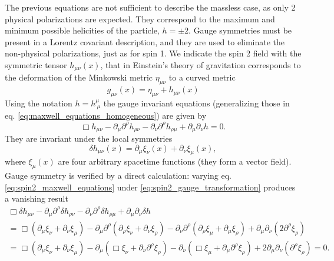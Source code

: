 The previous equations are not sufficient to describe the massless case, as only 2 physical polarizations are expected. They correspond to the maximum and minimum possible helicities of the particle, \(h=\pm 2\). Gauge symmetries must be present in a Lorentz covariant description, and they are used to eliminate the non-physical polarizations, just as for spin 1. We indicate the spin 2 field with the symmetric tensor \(h_{\mu \nu}(x)\), that in Einstein’s theory of gravitation corresponds to the deformation of the Minkowski metric \(\eta_{\mu \nu}\) to a curved metric
\begin{equation}
    g_{\mu \nu}(x)= \eta_{\mu \nu} + h_{\mu \nu}(x)
    \label{eq:metric_deformation}
\end{equation}
Using the notation \(h = h^{\mu}_{\ \mu}\) the gauge invariant equations (generalizing those in eq. \eqref{eq:maxwell_equations_homogeneous}) are given by
\begin{equation}
    \Box h_{\mu \nu} - \partial_\mu \partial^{\rho} h_{\rho \nu} - \partial_\nu \partial^{\rho} h_{\rho \mu} + \partial_\mu \partial_\nu h = 0.
    \label{eq:spin2_maxwell_equations}
\end{equation}
They are invariant under the local symmetries
\begin{equation}
    \delta h_{\mu \nu}(x) = \partial_\mu \xi_{\nu}(x) + \partial_\nu \xi_{\mu}(x),
    \label{eq:spin2_gauge_transformation}
\end{equation}
where \(\xi_{\mu}(x)\) are four arbitrary spacetime functions (they form a vector field). Gauge symmetry is verified by a direct calculation: varying eq. \eqref{eq:spin2_maxwell_equations} under \eqref{eq:spin2_gauge_transformation} produces a vanishing result
\[
    \begin{aligned}
        \Box \delta h_{\mu \nu} - \partial_\mu \partial^{\rho} \delta h_{\rho \nu} - \partial_\nu \partial^{\rho} \delta h_{\rho \mu} + \partial_\mu \partial_\nu \delta h                                                                                                                            \\
        = \Box (\partial_\mu \xi_{\nu} + \partial_\nu \xi_{\mu}) - \partial_\mu \partial^{\rho} (\partial_{\rho} \xi_{\nu} + \partial_\nu \xi_{\rho}) - \partial_\nu \partial^{\rho} (\partial_{\rho} \xi_{\mu} + \partial_\mu \xi_{\rho}) + \partial_\mu \partial_\nu (2 \partial^{\rho} \xi_{\rho}) \\
        = \Box (\partial_\mu \xi_{\nu} + \partial_\nu \xi_{\mu}) - \partial_\mu (\Box \xi_{\nu} + \partial_\nu \partial^{\rho} \xi_{\rho}) - \partial_\nu (\Box \xi_{\mu} + \partial_\mu \partial^{\rho} \xi_{\rho}) + 2 \partial_\mu \partial_\nu (\partial^{\rho} \xi_{\rho}) = 0.
    \end{aligned}
\]
